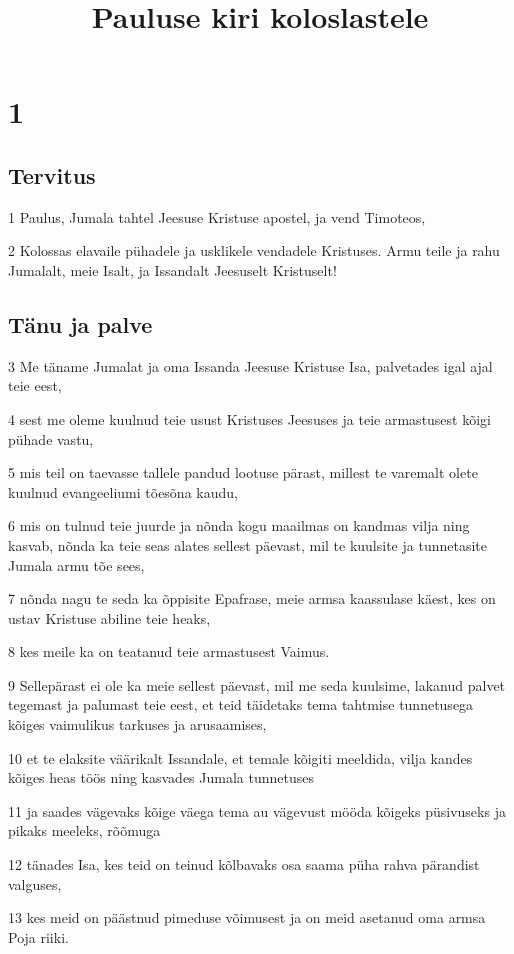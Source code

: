 

\title{Pauluse kiri koloslastele}

\chapter{1}

\section*{Tervitus}

\par 1 Paulus, Jumala tahtel Jeesuse Kristuse apostel, ja vend Timoteos,
\par 2 Kolossas elavaile pühadele ja usklikele vendadele Kristuses. Armu teile ja rahu Jumalalt, meie Isalt, ja Issandalt Jeesuselt Kristuselt!

\section*{Tänu ja palve}

\par 3 Me täname Jumalat ja oma Issanda Jeesuse Kristuse Isa, palvetades igal ajal teie eest,
\par 4 sest me oleme kuulnud teie usust Kristuses Jeesuses ja teie armastusest kõigi pühade vastu,
\par 5 mis teil on taevasse tallele pandud lootuse pärast, millest te varemalt olete kuulnud evangeeliumi tõesõna kaudu,
\par 6 mis on tulnud teie juurde ja nõnda kogu maailmas on kandmas vilja ning kasvab, nõnda ka teie seas alates sellest päevast, mil te kuulsite ja tunnetasite Jumala armu tõe sees,
\par 7 nõnda nagu te seda ka õppisite Epafrase, meie armsa kaassulase käest, kes on ustav Kristuse abiline teie heaks,
\par 8 kes meile ka on teatanud teie armastusest Vaimus.
\par 9 Sellepärast ei ole ka meie sellest päevast, mil me seda kuulsime, lakanud palvet tegemast ja palumast teie eest, et teid täidetaks tema tahtmise tunnetusega kõiges vaimulikus tarkuses ja arusaamises,
\par 10 et te elaksite väärikalt Issandale, et temale kõigiti meeldida, vilja kandes kõiges heas töös ning kasvades Jumala tunnetuses
\par 11 ja saades vägevaks kõige väega tema au vägevust mööda kõigeks püsivuseks ja pikaks meeleks, rõõmuga
\par 12 tänades Isa, kes teid on teinud kõlbavaks osa saama püha rahva pärandist valguses,
\par 13 kes meid on päästnud pimeduse võimusest ja on meid asetanud oma armsa Poja riiki.

